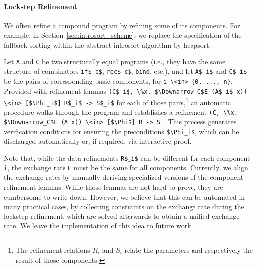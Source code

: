 \documentclass[acmsmall]{acmart}
\newcommand{\is}{\lstinline[language=isabelle]}
\begin{document}




\paragraph{Lockstep Refinement}
We often refine a compound program by refining some of its components.
For example, in Section~\ref{sec:introsort_scheme}, we replace the specification of the fallback sorting within the abstract introsort algorithm by heapsort.

Let \is{A} and \is{C} be two structurally equal programs (i.e., they have the same structure of combinators \is{if$_c$}, \is{rec$_c$}, \is{bind}, etc.), and let \is{A$_i$} and \is{C$_i$} be the pairs of corresponding basic components, for \is$i \<in> {0, ..., n}$.
Provided with refinement lemmas \is{(C$_i$, \%x. $\Downarrow_C$E (A$_i$ x)) \<in> [$\Phi_i$] R$_i$ -> S$_i$} for each of those pairs,\footnote{The refinement relations $R_i$ and $S_i$ relate the parameters and respectively the result of those components.} an automatic procedure walks through the program and establishes a refinement \is{(C, \%x. $\Downarrow_C$E (A x)) \<in> [$\Phi$] R -> S }.
This process generates verification conditions for ensuring the preconditions \is{$\Phi_i$}, which can be discharged automatically or, if required, via interactive proof.

Note that, while the data refinements \is{R$_i$} can be different for each component \is$i$, the exchange rate \is$E$ must be the same for all components.
%
Currently, we align the exchange rates by manually deriving 
specialized versions of the component refinement lemmas.
%
While those lemmas are not hard to prove, they are cumbersome to write down.
%
However, we believe that this can be automated in many practical cases, by collecting constraints on the exchange rate during the lockstep refinement, which are solved afterwards to obtain a unified exchange rate. We leave the implementation of this idea to future work.
\end{document}
